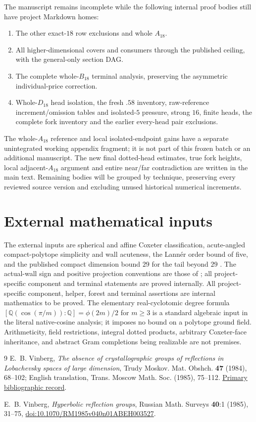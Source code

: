 \documentclass[11pt]{article}
\theoremstyle{definition}
\theoremstyle{remark}
\begin{document}
The manuscript remains incomplete while the following internal proof
bodies still have project Markdown homes:
\begin{enumerate}
\item The other exact-\(18\) row exclusions and whole \(A_{18}\).
\item All higher-dimensional covers and consumers through the
 published ceiling, with the general-only section DAG.
\item The complete whole-\(B_{18}\) terminal analysis, preserving
 the asymmetric individual-price correction.
\item Whole-\(D_{18}\) head isolation, the fresh \(.58\) inventory,
 raw-reference increment/omission tables and isolated-\(5\)
 pressure, strong \(16\), finite heads, the complete fork
 inventory and the earlier every-head pair exclusions.
\end{enumerate}
The whole-\(A_{18}\) reference and local isolated-endpoint gains
have a separate unintegrated working appendix fragment; it is
not part of this frozen batch or an additional manuscript.
The new final dotted-head estimates, true fork heights,
local adjacent-\(A_{18}\) argument and entire near/far contradiction
are written in the main text. Remaining bodies will be grouped by
technique, preserving every reviewed source version and excluding
unused historical numerical increments.

\section{External mathematical inputs}
\label{app:external}
The external inputs are spherical and affine Coxeter
classification, acute-angled compact-polytope simplicity
and wall acuteness, the Lann\'er order bound of five, and the published compact dimension
bound \(29\) for the tail beyond \(29\) \cite{Vin84,Vin85}.
The actual-wall sign and positive projection conventions are
those of \cite[p.~42, \S2.1]{Vin85}; all project-specific
component and terminal statements are proved internally.
All project-specific component, helper, forest and terminal
assertions are internal mathematics to be proved.
The elementary real-cyclotomic degree formula
\([\mathbb Q(\cos(\pi/m)):\mathbb Q]=\phi(2m)/2\) for \(m\geq3\)
is a standard algebraic input in the literal native-cosine analysis; it
imposes no bound on a polytope ground field.
Arithmeticity, field restrictions, integral dotted products,
arbitrary Coxeter-face inheritance, and abstract Gram
completions being realizable are not premises.
\begin{thebibliography}{9}
E.~B. Vinberg,
\emph{The absence of crystallographic groups of reflections in
Lobachevsky spaces of large dimension},
Trudy Moskov. Mat. Obshch. \textbf{47} (1984), 68--102;
English translation, Trans. Moscow Math. Soc. (1985), 75--112.
\href{https://www.mathnet.ru/eng/mmo444}{Primary bibliographic record}.

E.~B. Vinberg,
\emph{Hyperbolic reflection groups},
Russian Math. Surveys \textbf{40}:1 (1985), 31--75,
\href{https://doi.org/10.1070/RM1985v040n01ABEH003527}
{doi:10.1070/RM1985v040n01ABEH003527}.
\end{thebibliography}
\end{document}
